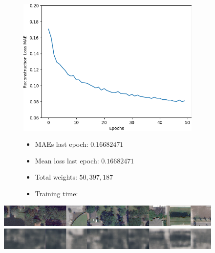 \vspace{-3em}

\begin{figure}[H]
    \centering
    \begin{subfigure}{.5\textwidth}
        \centering
        \includegraphics[width=\textwidth]
        {images/figures/experiments_architecture/mae_graphKernel3adjusted2x2x256_dim1024.png}
    \end{subfigure}%
    \begin{subfigure}{.5\textwidth}
      \begin{itemize}
          \item MAEs last epoch: $0.16682471$
          \item Mean loss last epoch: $0.16682471$
          \item Total weights: $50,397,187$
          \item Training time:
      \end{itemize}
    \end{subfigure}
\end{figure}

\vspace{-2em}

\begin{figure}[H]
    \centering
    \includegraphics[width=\textwidth]
    {images/figures/experiments_architecture/inputsKernel3adjusted2x2x256_dim1024.png}
    \includegraphics[width=\textwidth]
    {images/figures/experiments_architecture/reconstructionsKernel3adjusted2x2x256_dim1024.png}
\end{figure}


